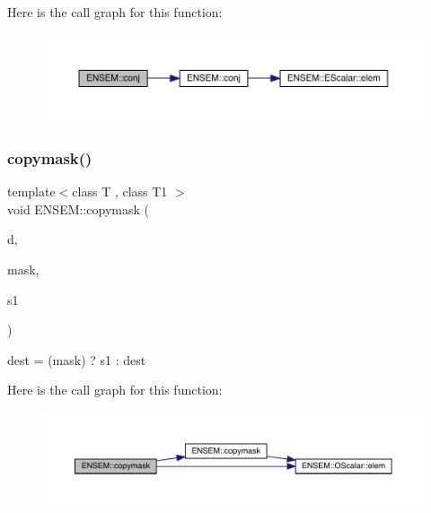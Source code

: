 Here is the call graph for this function\+:\nopagebreak
\begin{figure}[H]
\begin{center}
\leavevmode
\includegraphics[width=350pt]{da/d59/group__obsvector_ga77a1805866a66a7f5215fb784b9c2725_cgraph}
\end{center}
\end{figure}
\mbox{\label{group__obsvector_ga36fbe4267e04acd96a7558ca09b16912}} 
\subsubsection{\texorpdfstring{copymask()}{copymask()}}
{\footnotesize\ttfamily template$<$class T , class T1 $>$ \\
void E\+N\+S\+E\+M\+::copymask (\begin{DoxyParamCaption}\item[{\mbox{\hyperlink{classENSEM_1_1OVector}{O\+Vector}}$<$ T $>$ \&}]{d,  }\item[{const \mbox{\hyperlink{classENSEM_1_1OScalar}{O\+Scalar}}$<$ T1 $>$ \&}]{mask,  }\item[{const \mbox{\hyperlink{classENSEM_1_1OVector}{O\+Vector}}$<$ T $>$ \&}]{s1 }\end{DoxyParamCaption})\hspace{0.3cm}{\ttfamily [inline]}}



dest = (mask) ? s1 \+: dest 

Here is the call graph for this function\+:\nopagebreak
\begin{figure}[H]
\begin{center}
\leavevmode
\includegraphics[width=350pt]{da/d59/group__obsvector_ga36fbe4267e04acd96a7558ca09b16912_cgraph}
\end{center}
\end{figure}
\mbox{\label{group__obsvector_ga723a9a3fcfd45943398e215f7702a7a2}} 

